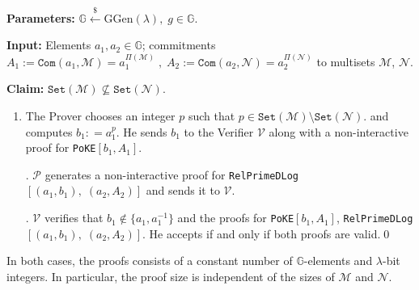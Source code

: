 \documentclass[11pt, lettersize, notitlepage, leqno, footskip=0.6cm]{article}
\newcommand{\ttt}{\texttt}
\newcommand{\sett}{\ttt{Set}}
\newcommand{\mc}{\mathcal}
\newcommand{\mb}{\mathbb}
\newcommand{\mbf}{\mathbf}
\newcommand{\mr}{\mathrm}
\newcommand{\lam}{\lambda}
\newcommand{\lamb}{\lambda}
\newcommand{\nsub}{\nsubseteq}
\newcommand{\mP}{\mc{P}}
\newcommand{\V}{\mc{V}}
\newcommand{\mcM}{\mc{M}}
\newcommand{\vs}{\vspace{-0.15cm}}
\newcommand{\noin}{\noindent}
\numberwithin{equation}{section}
\begin{document}
{{{\noin \textbf{Parameters:} $\mb{G}\xleftarrow{\$} \mr{GGen}(\lamb), \; g\in \mb{G}$. 

\noin \textbf{Input:} Elements $a_1,a_2\in\mb{G}$; commitments $A_1 := \ttt{Com}(a_1, \mc{M}) = a_1^{\Pi(\mc{M})}\;,\;A_2 := \ttt{Com}(a_2, \mc{N})= a_2^{\Pi(\mc{N})}$ to multisets $\mc{M}$, $\mc{N}$.

\noin \textbf{Claim:} $\sett(\mc{M})\nsub \sett(\mc{N})$. \vs

\begin{enumerate}[wide, labelwidth=!, labelindent=0pt] \vs \item The Prover chooses an integer $p$ such that $p\in \sett(\mc{M})\setminus \sett(\mc{N}).$ and computes $b_1: = a_1^p$. He sends $b_1$ to the Verifier $\V$ along with a non-interactive proof for \verb|PoKE|$[b_1, A_1]$.

\noin 2. $\mP$ generates a non-interactive proof for \verb|RelPrimeDLog|$[(a_1, b_1),\; (a_2, A_2)]$ and sends it to $\V$.

\noin 3. $\V$ verifies that $b_1\notin \{ a_1, a_1^{-1}\}$ and the proofs for \verb|PoKE|$[b_1, A_1]$, \verb|RelPrimeDLog|$[(a_1, b_1),\; (a_2, A_2)]$. He accepts if and only if both proofs are valid.\qed \end{enumerate}

\noin In both cases, the proofs consists of a constant number of $\mb{G}$-elements and $\lam$-bit integers. In particular, the proof size is independent of the sizes of $\mcM$ and $\mc{N}$.








\begin{comment}

\section{\fontsize{11}{11}\selectfont More protocols}

In what follows, we provide an argument of knowledge for the relation \vs

\[
  \mc{R}_{{\ttt{EqDLogPairs}}}[(a_1, \mbf{b}),\; (a_2, \mbf{c})] = \left\{\begin{array}{l}
  	((a_1, a_2)\in\mb{G}^2\\
    \mbf{b} = (b_1,\cdots, b_n)\;,\;\mbf{c} = (c_1,\cdots, c_n)\;\in\mb{G}^n);\\
    (d_1,\cdots,d_n)\in\mb{Z}^n): \\
    b_i = a_1^{d_i}\;,\;c_i = a_2^{d_i} \;\forall\;i
  \end{array}\right\}
\]


\end{comment}}}}
\end{document}
